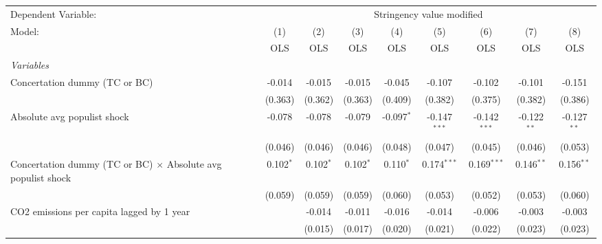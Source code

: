 
\begingroup
\centering
\begin{tabular}{lcccccccc}
   \toprule
   Dependent Variable: & \multicolumn{8}{c}{Stringency value modified}\\
   Model:                                                              & (1)         & (2)         & (3)         & (4)          & (5)            & (6)            & (7)           & (8)\\  
                                                                       &  OLS        & OLS         & OLS         & OLS          & OLS            & OLS            & OLS           & OLS\\  
   \midrule
   \emph{Variables}\\
   Concertation dummy (TC or BC)                                       & -0.014      & -0.015      & -0.015      & -0.045       & -0.107         & -0.102         & -0.101        & -0.151\\   
                                                                       & (0.363)     & (0.362)     & (0.363)     & (0.409)      & (0.382)        & (0.375)        & (0.382)       & (0.386)\\   
   Absolute avg populist shock                                         & -0.078      & -0.078      & -0.079      & -0.097$^{*}$ & -0.147$^{***}$ & -0.142$^{***}$ & -0.122$^{**}$ & -0.127$^{**}$\\   
                                                                       & (0.046)     & (0.046)     & (0.046)     & (0.048)      & (0.047)        & (0.045)        & (0.046)       & (0.053)\\   
   Concertation dummy (TC or BC) $\times$ Absolute avg populist shock  & 0.102$^{*}$ & 0.102$^{*}$ & 0.102$^{*}$ & 0.110$^{*}$  & 0.174$^{***}$  & 0.169$^{***}$  & 0.146$^{**}$  & 0.156$^{**}$\\   
                                                                       & (0.059)     & (0.059)     & (0.059)     & (0.060)      & (0.053)        & (0.052)        & (0.053)       & (0.060)\\   
   CO2 emissions per capita lagged by 1 year                           &             & -0.014      & -0.011      & -0.016       & -0.014         & -0.006         & -0.003        & -0.003\\   
                                                                       &             & (0.015)     & (0.017)     & (0.020)      & (0.021)        & (0.022)        & (0.023)       & (0.023)\\   

\end{tabular}
